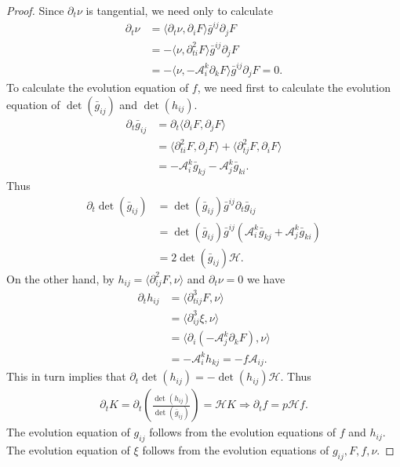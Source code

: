 \documentclass{amsart}
\theoremstyle{definition}
\theoremstyle{remark}
\numberwithin{equation}{section}
\begin{document}
\begin{proof}
Since $\partial_t \nu$ is tangential, we need only to calculate
\begin{align*}
\partial_t\nu&=\langle \partial_t\nu,\partial_iF\rangle \bar{g}^{ij}\partial_jF\\
&=-\langle \nu,\partial^2_{ti}F\rangle \bar{g}^{ij}\partial_jF\\
&=-\langle \nu,-\mathcal{A}_i^k\partial_kF\rangle \bar{g}^{ij}\partial_jF=0.
\end{align*}
To calculate the evolution equation of $ f $, we need first to calculate the evolution equation of $\det(\bar{g}_{ij})$ and $\det(h_{ij}).$
\begin{align*}
\partial_t \bar{g}_{ij}&=\partial_t \langle \partial_iF,\partial_jF\rangle\\
&=\langle \partial_{ti}^2F,\partial_jF\rangle+\langle \partial_{tj}^2F,\partial_iF\rangle\\
&=-\mathcal{A}_{i}^k\bar{g}_{kj}-\mathcal{A}_{j}^k\bar{g}_{ki}.
\end{align*}
Thus
\begin{align*}
\partial_t\det (\bar{g}_{ij})&=\det (\bar{g}_{ij})\bar{g}^{ij}\partial_t\bar{g}_{ij}\\
&=\det (\bar{g}_{ij})\bar{g}^{ij}
(\mathcal{A}_{i}^k\bar{g}_{kj}+\mathcal{A}_{j}^k\bar{g}_{ki})\\
&=2\det (\bar{g}_{ij})\mathcal{H}.
\end{align*}
On the other hand, by $h_{ij}=\langle \partial_{ij}^2F, \nu\rangle$ and $\partial_t\nu=0$ we have
\begin{align*}
\partial_t h_{ij}&=\langle\partial^3_{tij}F,\nu\rangle\\
&=\langle\partial^3_{ij}\xi,\nu\rangle\\
&=\langle \partial_i(-\mathcal{A}_j^k\partial_kF),\nu\rangle\\
&=-\mathcal{A}_i^kh_{kj}=- f  \mathcal{A}_{ij}.
\end{align*}
This in turn implies that $\partial_t\det(h_{ij})=-\det(h_{ij})\mathcal{H}.$
Thus
\begin{align*}
\partial_t K =\partial_t\left(\frac{\det(h_{ij})}{\det(\bar{g}_{ij})}\right)=\mathcal{H} K \Rightarrow \partial_t  f = p  \mathcal{H} f .
\end{align*}
The evolution equation of $g_{ij}$ follows from the evolution equations of $ f $ and $h_{ij}.$ The evolution equation of $\xi$ follows from the evolution equations of $g_{ij}, F,  f ,\nu.$ %

\end{proof}
\end{document}
